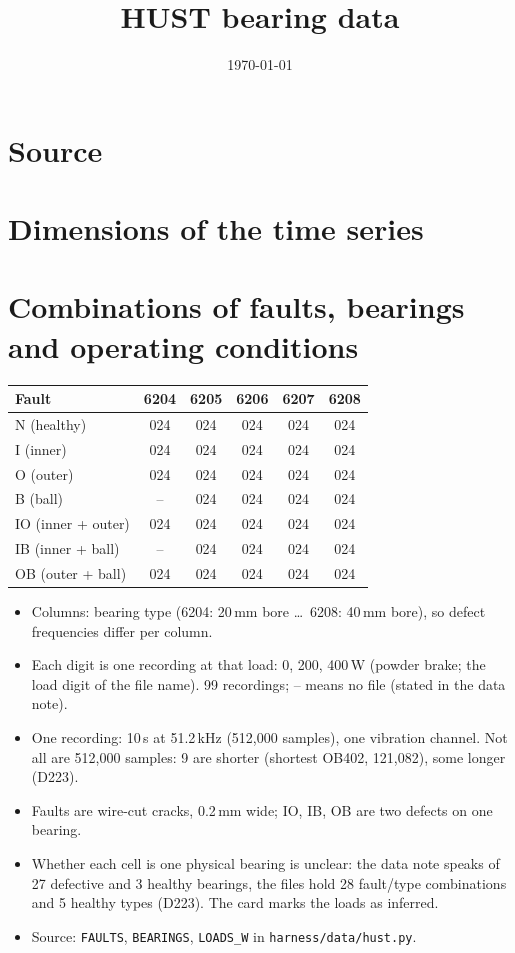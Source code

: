 \documentclass[11pt,a4paper]{article}
\title{HUST bearing data}
\author{}
\date{\today}
\begin{document}
\maketitle

\section{Source}

\section{Dimensions of the time series}

\section{Combinations of faults, bearings and operating conditions}

\begin{table}[h]
\centering
\small
\begin{tabular}{l ccccc}
\toprule
Fault & 6204 & 6205 & 6206 & 6207 & 6208 \\
\midrule
N (healthy)        & 024 & 024 & 024 & 024 & 024 \\
I (inner)          & 024 & 024 & 024 & 024 & 024 \\
O (outer)          & 024 & 024 & 024 & 024 & 024 \\
B (ball)           & --  & 024 & 024 & 024 & 024 \\
IO (inner + outer) & 024 & 024 & 024 & 024 & 024 \\
IB (inner + ball)  & --  & 024 & 024 & 024 & 024 \\
OB (outer + ball)  & 024 & 024 & 024 & 024 & 024 \\
\bottomrule
\end{tabular}
\end{table}

\begin{itemize}
  \item Columns: bearing type (6204: 20\,mm bore \dots\ 6208: 40\,mm bore), so defect
        frequencies differ per column.
  \item Each digit is one recording at that load: 0, 200, 400\,W (powder brake; the load
        digit of the file name). 99 recordings; -- means no file (stated in the data note).
  \item One recording: 10\,s at 51.2\,kHz (512,000 samples), one vibration channel.
        Not all are 512,000 samples: 9 are shorter (shortest OB402, 121,082), some longer (D223).
  \item Faults are wire-cut cracks, 0.2\,mm wide; IO, IB, OB are two defects on one bearing.
  \item Whether each cell is one physical bearing is unclear: the data note speaks of 27
        defective and 3 healthy bearings, the files hold 28 fault/type combinations and 5
        healthy types (D223). The card marks the loads as inferred.
  \item Source: \texttt{FAULTS}, \texttt{BEARINGS}, \texttt{LOADS\_W} in \texttt{harness/data/hust.py}.
\end{itemize}
\end{document}
